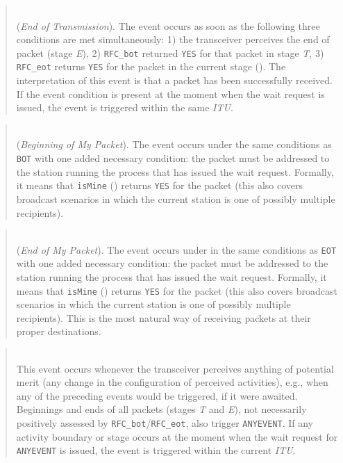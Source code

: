 \begin{quote}
\noindent{}\\ \hspace{0in}
({\em End of Transmission\/}).
The event occurs as soon as the following three conditions are met
simultaneously: 1) the transceiver perceives the end of packet
(stage {\em E\/}), 2) {\tt RFC\_bot} returned {\tt YES} for that packet
in stage {\em T}, 3)
{\tt RFC\_eot} returns {\tt YES} for the packet in the
current stage ().
The interpretation of this event is that a packet has been successfully
received.
If the event condition is present at the moment when the wait request is
issued, the event is triggered within the same {\em ITU}.
\end{quote}

\begin{quote}
\noindent{}\\ \hspace{0in}
({\em Beginning of My Packet\/}).
The event occurs under the same conditions as {\tt BOT} with one added necessary
condition: the packet must be addressed to the station running the process
that has issued the wait request.
Formally, it means that {\tt isMine} () returns {\tt YES}
for the packet (this also covers broadcast scenarios in which the current
station is one of possibly multiple recipients).
\end{quote}

\begin{quote}
\noindent{}\\ \hspace{0in}
({\em End of My Packet\/}).
The event occurs under
in the same conditions as {\tt EOT} with one added necessary
condition: the packet must be addressed to the station running the process
that has issued the wait request.
Formally, it means that {\tt isMine} () returns {\tt YES}
for the packet (this also covers broadcast scenarios in which the current
station is one of possibly multiple recipients).
This is the most natural way of receiving packets at their proper
destinations.
\end{quote}

\begin{quote}
\noindent{}\\ \hspace{0in}
This event occurs whenever the transceiver perceives anything of
potential merit (any change in the configuration of perceived activities),
e.g., when any of the preceding events would be triggered,
if it were awaited.
Beginnings and ends of all packets (stages {\em T\/} and {\em E\/}),
not necessarily
positively assessed by {\tt RFC\_bot}/{\tt RFC\_eot}, also
trigger {\tt ANYEVENT}.
If any activity boundary or stage occurs at the moment when the wait request
for {\tt ANYEVENT} is issued,
the event is triggered within the current {\em ITU}.
\end{quote}

